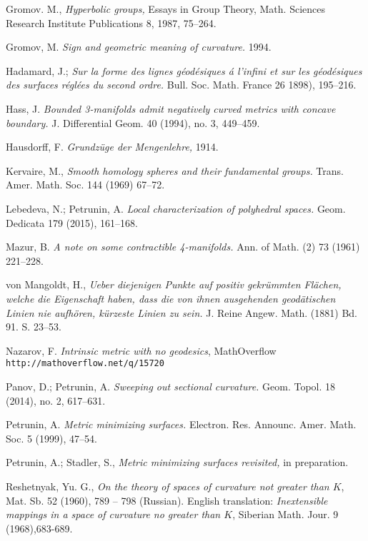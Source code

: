 \begin{thebibliography}{52}
Gromov. M.,
\textit{Hyperbolic groups,} 
Essays in Group Theory,
Math. Sciences Research Institute Publications 8,
1987, 75--264.

Gromov, M.
\textit{Sign and geometric meaning of curvature.}
1994.

Hadamard, J.;
\textit{Sur la forme des lignes g\'eod\'esiques \'a l'infini et sur les g\'eod\'esiques des surfaces r\'egl\'ees du second ordre.}
Bull. Soc. Math. France 
26 
1898), 
195--216.

 Hass, J.
\textit{Bounded 3-manifolds admit negatively curved metrics with concave boundary.}
J. Differential Geom. 
40 (1994), 
no. 3, 
449--459. 

Hausdorff, F. 
\textit{Grundz\"uge der Mengenlehre,} 
1914.

Kervaire, M., 
\textit{Smooth homology spheres and their fundamental groups.}
Trans. Amer. Math. Soc. 
144 
(1969) 
67--72.

Lebedeva, N.; 
Petrunin, A. 
\textit{Local characterization of polyhedral spaces.} Geom. Dedicata 179 (2015), 161--168.

Mazur, B. 
\textit{A note on some contractible 4-manifolds.} 
Ann. of Math. (2) 
73 
(1961) 
221--228.

von Mangoldt, H., 
\textit{Ueber diejenigen Punkte auf positiv gekr\"ummten Fl\"achen, welche die Eigenschaft haben, dass die von ihnen ausgehenden geod\"atischen Linien nie aufh\"oren, k\"urzeste Linien zu sein.} 
J. Reine Angew. Math. (1881) Bd. 91. S. 23--53.

Nazarov, F.
\textit{Intrinsic metric with no geodesics},
MathOverflow \texttt{http://mathoverflow.net/q/15720}

Panov, D.; Petrunin, A.
\textit{Sweeping out sectional curvature.} 
Geom. Topol. 
18 
(2014), 
no. 2, 
617--631. 

Petrunin, A.
\textit{Metric minimizing surfaces.}
Electron. Res. Announc. Amer. Math. Soc. 
5 
(1999), 
47--54.


Petrunin, A.; 
Stadler, S., 
\textit{Metric minimizing surfaces revisited,}
in preparation.

Reshetnyak, Yu. G.,
\textit{On the theory of spaces of curvature not greater than $K$},
 Mat. Sb. 52 (1960), 789 -- 798 (Russian).
English translation: \textit{Inextensible mappings in a space of curvature
no greater than $K$}, Siberian Math. Jour. 9 (1968),683-689.


\end{thebibliography}
